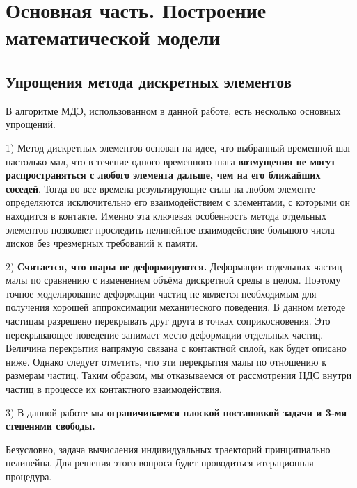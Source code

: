 \documentclass[utf8x, 14pt, oneside, a4paper]{article}
\begin{document}
		\pagebreak

\section{Основная часть. Построение математической модели}

\subsection{Упрощения метода дискретных элементов}
В алгоритме МДЭ, использованном в данной работе, есть несколько основных упрощений. 

1) Метод дискретных элементов основан на идее, что выбранный временной шаг настолько мал, что в течение одного временного шага \textbf{возмущения не могут распространяться с любого элемента дальше, чем на его ближайших соседей}. 
Тогда во все времена результирующие силы на любом элементе определяются исключительно его взаимодействием с элементами, с которыми он находится в контакте.
Именно эта ключевая особенность метода отдельных элементов позволяет проследить нелинейное взаимодействие большого числа дисков без чрезмерных требований к памяти.

2) \textbf{Считается, что шары не деформируются.}
Деформации отдельных частиц малы по сравнению с изменением объёма дискретной среды в целом.
Поэтому точное моделирование деформации частиц не является необходимым для получения хорошей аппроксимации механического поведения. 
В данном методе частицам разрешено перекрывать друг друга в точках соприкосновения. 
Это перекрывающее поведение занимает место деформации отдельных частиц. 
Величина перекрытия напрямую связана с контактной силой, как будет описано ниже.
Однако следует отметить, что эти перекрытия малы по отношению к размерам частиц.
Таким образом, мы отказываемся от рассмотрения НДС внутри частиц в процессе их контактного взаимодействия.

3) В данной работе мы \textbf{ограничиваемся плоской постановкой задачи и 3-мя степенями свободы.}

Безусловно, задача вычисления индивидуальных траекторий принципиально нелинейна.
Для решения этого вопроса будет проводиться итерационная процедура.

\end{document}
